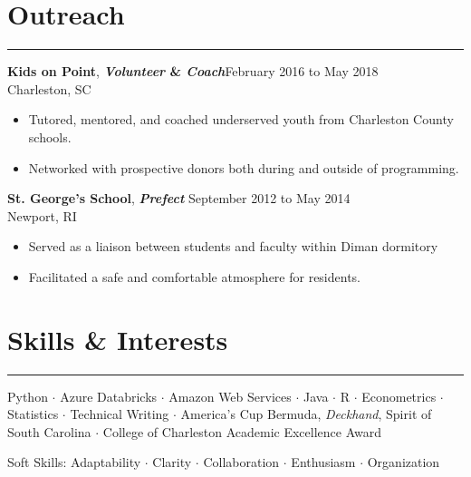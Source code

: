 \documentclass[11pt]{article}
\newcommand{\resumesection}[1]{\vspace{-0.7cm}\section*{#1}\vspace{-0.2cm}\hrule\vspace{0.2cm}}
\begin{document}
\resumesection{Outreach}
\textbf{Kids on Point}, \textbf{\textit{Volunteer} \& \textit{Coach}}\hfill February 2016 to May 2018\\
 Charleston, SC
\begin{itemize}
	\item Tutored, mentored, and coached underserved youth from Charleston County schools.
	\item Networked with prospective donors both during and outside of programming.\\
\end{itemize}
\textbf{St. George's School}, \textbf{\textit{Prefect}} \hfill September 2012 to May 2014\\Newport, RI
\begin{itemize}
	\item Served as a liaison between students and faculty within Diman dormitory
	\item Facilitated a safe and comfortable atmosphere for residents.\\
\end{itemize}
\resumesection{Skills  \& Interests}
\setlength\parindent{0cm}\normalfont Python $\cdot$ Azure Databricks $\cdot$ Amazon Web Services $\cdot$ Java $\cdot$ R $\cdot$ Econometrics $\cdot$ Statistics  $\cdot$ Technical Writing $\cdot$ America's Cup Bermuda, \textit{Deckhand}, Spirit of South Carolina $\cdot$ College of Charleston Academic Excellence Award\\
\centerline{Soft Skills: Adaptability $\cdot$ Clarity $\cdot$ Collaboration $\cdot$ Enthusiasm $\cdot$ Organization}
\end{document}

